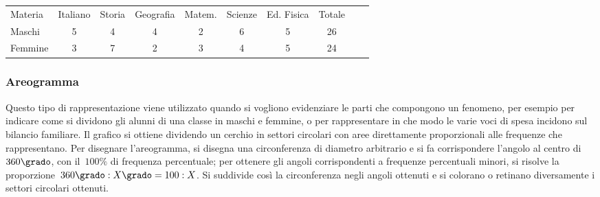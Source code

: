 \vspace*{-6pt}
\begin{center}
 \begin{tabularx}{.95\textwidth}{X*{7}{c}Xc}
\toprule
Materia& Italiano &Storia & Geografia & Matem. & Scienze & Ed. Fisica & 
Totale\\
Maschi & 5 & 4& 4 & 2& 6 & 5& 26\\
Femmine & 3 & 7 & 2 & 3  & 4 & 5 & 24\\
\bottomrule
\end{tabularx}
\end{center}

\subsubsection{Areogramma}
Questo tipo di rappresentazione viene utilizzato quando si vogliono 
evidenziare le parti che compongono un fenomeno, per esempio per indicare
come si dividono gli alunni di una classe in maschi e femmine, o per 
rappresentare in che modo
le varie voci di spesa incidono sul bilancio familiare.
Il grafico si ottiene dividendo un cerchio in settori circolari con aree 
direttamente proporzionali alle frequenze che rappresentano.
Per disegnare l'areogramma, si disegna una circonferenza di diametro 
arbitrario e si fa corrispondere l'angolo al centro di~\(360\grado\),
con il~\(100\%\) di frequenza percentuale; per ottenere gli angoli 
corrispondenti a frequenze percentuali minori, si risolve la 
proporzione~\(360\grado:X\grado=100:X\).
Si suddivide così la circonferenza negli angoli ottenuti e si colorano o 
retinano diversamente i settori circolari ottenuti.

